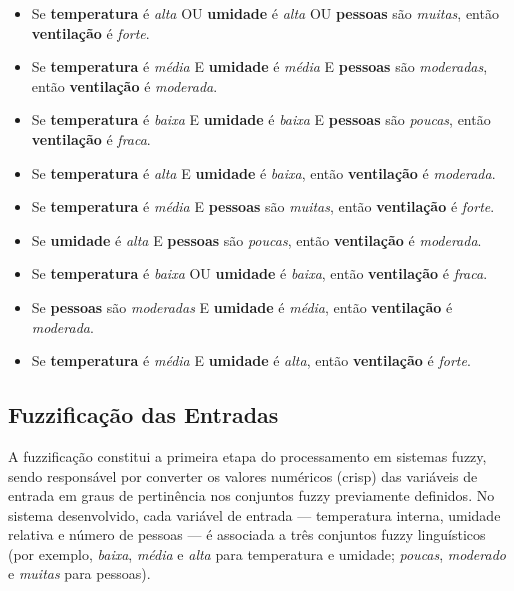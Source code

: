 \begin{itemize}
    \item Se \textbf{temperatura} é \textit{alta} OU \textbf{umidade} é \textit{alta} OU \textbf{pessoas} são \textit{muitas}, então \textbf{ventilação} é \textit{forte}.
    \item Se \textbf{temperatura} é \textit{média} E \textbf{umidade} é \textit{média} E \textbf{pessoas} são \textit{moderadas}, então \textbf{ventilação} é \textit{moderada}.
    \item Se \textbf{temperatura} é \textit{baixa} E \textbf{umidade} é \textit{baixa} E \textbf{pessoas} são \textit{poucas}, então \textbf{ventilação} é \textit{fraca}.
    \item Se \textbf{temperatura} é \textit{alta} E \textbf{umidade} é \textit{baixa}, então \textbf{ventilação} é \textit{moderada}.
    \item Se \textbf{temperatura} é \textit{média} E \textbf{pessoas} são \textit{muitas}, então \textbf{ventilação} é \textit{forte}.
    \item Se \textbf{umidade} é \textit{alta} E \textbf{pessoas} são \textit{poucas}, então \textbf{ventilação} é \textit{moderada}.
    \item Se \textbf{temperatura} é \textit{baixa} OU \textbf{umidade} é \textit{baixa}, então \textbf{ventilação} é \textit{fraca}.
    \item Se \textbf{pessoas} são \textit{moderadas} E \textbf{umidade} é \textit{média}, então \textbf{ventilação} é \textit{moderada}.
    \item Se \textbf{temperatura} é \textit{média} E \textbf{umidade} é \textit{alta}, então \textbf{ventilação} é \textit{forte}.
\end{itemize}


\subsection{Fuzzificação das Entradas}

A fuzzificação constitui a primeira etapa do processamento em sistemas fuzzy, sendo responsável por converter os valores numéricos (crisp) das variáveis de entrada em graus de pertinência nos conjuntos fuzzy previamente definidos. No sistema desenvolvido, cada variável de entrada --- temperatura interna, umidade relativa e número de pessoas --- é associada a três conjuntos fuzzy linguísticos (por exemplo, \textit{baixa}, \textit{média} e \textit{alta} para temperatura e umidade; \textit{poucas}, \textit{moderado} e \textit{muitas} para pessoas).

